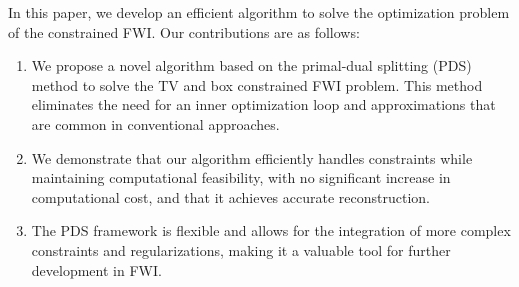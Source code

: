 In this paper, we develop an efficient algorithm to solve the optimization problem of the constrained FWI. Our contributions are as follows:
\begin{enumerate}
      \item We propose a novel algorithm based on the primal-dual splitting (PDS) method to solve the TV and box constrained FWI problem.
            This method eliminates the need for an inner optimization loop and approximations that are common in conventional approaches.
      \item We demonstrate that our algorithm efficiently handles constraints while maintaining computational feasibility, with no significant increase in computational cost, and that it achieves accurate reconstruction.
      \item The PDS framework is flexible and allows for the integration of more complex constraints and regularizations, making it a valuable tool for further development in FWI.
\end{enumerate}


